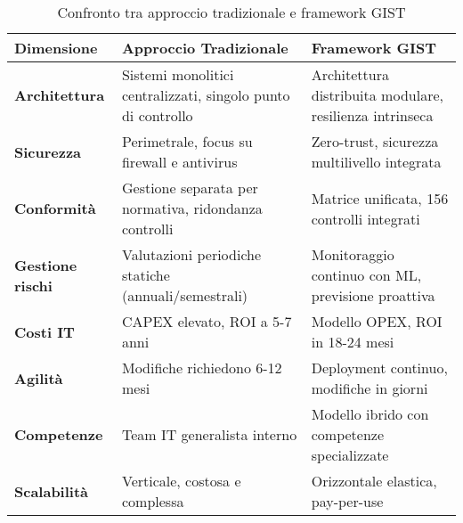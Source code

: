 
\begin{table}[htbp]
\centering
\caption{Confronto tra approccio tradizionale e framework GIST}
\label{tab:confronto_approcci}
\begin{tabular}{|p{3.5cm}|p{5cm}|p{5cm}|}
\hline
\textbf{Dimensione} & \textbf{Approccio Tradizionale} & \textbf{Framework GIST} \\
\hline
\hline
\textbf{Architettura} & 
Sistemi monolitici centralizzati, singolo punto di controllo & 
Architettura distribuita modulare, resilienza intrinseca \\
\hline
\textbf{Sicurezza} & 
Perimetrale, focus su firewall e antivirus & 
Zero-trust, sicurezza multilivello integrata \\
\hline
\textbf{Conformità} & 
Gestione separata per normativa, ridondanza controlli & 
Matrice unificata, 156 controlli integrati \\
\hline
\textbf{Gestione rischi} & 
Valutazioni periodiche statiche (annuali/semestrali) & 
Monitoraggio continuo con ML, previsione proattiva \\
\hline
\textbf{Costi IT} & 
CAPEX elevato, ROI a 5-7 anni & 
Modello OPEX, ROI in 18-24 mesi \\
\hline
\textbf{Agilità} & 
Modifiche richiedono 6-12 mesi & 
Deployment continuo, modifiche in giorni \\
\hline
\textbf{Competenze} & 
Team IT generalista interno & 
Modello ibrido con competenze specializzate \\
\hline
\textbf{Scalabilità} & 
Verticale, costosa e complessa & 
Orizzontale elastica, pay-per-use \\
\hline
\end{tabular}
\end{table}


